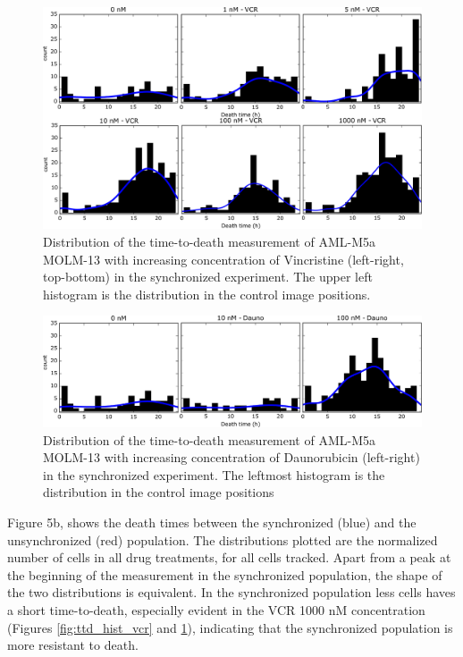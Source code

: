 \documentclass[pdftex,12pt,a4paper]{report}
\begin{document}
\begin{figure}[H]
\centering
\includegraphics[width=\textwidth]{images/ttd/syn/vcr_all.pdf}
\caption[Distribution of TTD for every Vincristine concentration in the synchronized experiment]{Distribution of the time-to-death measurement of AML-M5a MOLM-13 with increasing concentration of Vincristine (left-right, top-bottom) in the synchronized experiment. The upper left histogram is the distribution in the control image positions.}
\label{fig:ttd_scatter_vcr_syn}
\end{figure}

\begin{figure}[H]
\centering
\includegraphics[width=\textwidth]{images/ttd/syn/dauno_all.pdf}
\caption[Distribution of TTD for every Daunorubicin concentration in the synchronized experiment]{Distribution of the time-to-death measurement of AML-M5a MOLM-13 with increasing concentration of Daunorubicin (left-right) in the synchronized experiment. The leftmost histogram is the distribution in the control image positions}
\label{fig:ttd_scatter_dauno_syn}
\end{figure}

Figure 5b, shows the death times between the synchronized (blue) and the unsynchronized (red) population. The distributions plotted are the normalized number of cells in all drug treatments, for all cells tracked. Apart from a peak at the beginning of the measurement in the synchronized population, the shape of the two distributions is equivalent. In the synchronized population less cells haves a short time-to-death, especially evident in the VCR 1000 nM concentration (Figures \ref{fig:ttd_hist_vcr} and \ref{fig:ttd_scatter_vcr_syn}), indicating that the synchronized population is more resistant to death. 
\end{document}
